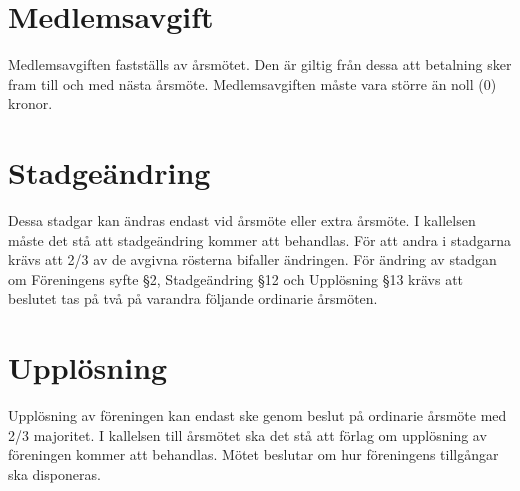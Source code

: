 \documentclass[a4paper,11pt,oneside]{article}
\begin{document}
\section{Medlemsavgift}
Medlemsavgiften fastställs av årsmötet. Den är giltig från dessa att betalning
sker fram till och med nästa årsmöte. Medlemsavgiften måste vara större än
noll (0) kronor.

\section{Stadgeändring}
Dessa stadgar kan ändras endast vid årsmöte eller extra årsmöte. I kallelsen
måste det stå att stadgeändring kommer att behandlas. För att andra i stadgarna
krävs att 2/3 av de avgivna rösterna bifaller ändringen. För ändring av stadgan
om Föreningens syfte §2, Stadgeändring §12 och Upplösning §13 krävs att beslutet
tas på två på varandra följande ordinarie årsmöten.

\section{Upplösning}
Upplösning av föreningen kan endast ske genom beslut på ordinarie årsmöte med
2/3 majoritet. I kallelsen till årsmötet ska det stå att förlag om upplösning av
föreningen kommer att behandlas. Mötet beslutar om hur föreningens tillgångar
ska disponeras.
\end{document}
